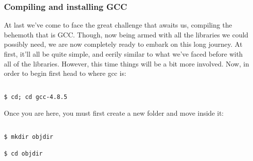 \documentclass[]{article}
\begin{document}
                                                                                                                                                                                     \subsubsection{Compiling and installing GCC}
                                                                                                                                                                                     At last we've come to face the great challenge that awaits us, compiling the behemoth that is GCC. Though, now being armed with all the
                                                                                                                                                                                     libraries we could possibly need, we are now completely ready to embark on this long journey. At first, it'll all be quite simple, and 
                                                                                                                                                                                     eerily similar to what we've faced before with all of the libraries. However, this time things will be a bit more involved. Now, in
                                                                                                                                                                                     order to begin first head to where gcc is:
                                                                                                                                                                                     \begin{lstlisting}
                                                                                                                                                                                     $ cd; cd gcc-4.8.5
                                                                                                                                                                                     \end{lstlisting}
                                                                                                                                                                                     Once you are here, you must first create a new folder and move inside it:
                                                                                                                                                                                     \begin{lstlisting}
                                                                                                                                                                                     $ mkdir objdir
                                                                                                                                                                                     $ cd objdir
                                                                                                                                                                                     \end{lstlisting}
\end{document}
